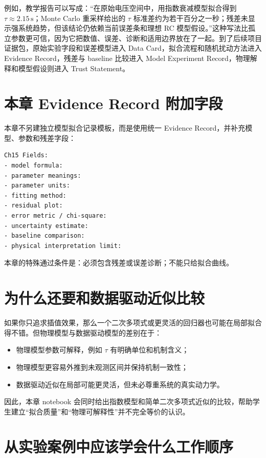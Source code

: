 例如，教学报告可以写成：“在原始电压空间中，用指数衰减模型拟合得到 $\tau \approx 2.15\,\mathrm{s}$；Monte Carlo 重采样给出的 $\tau$ 标准差约为若干百分之一秒；残差未显示强系统趋势，但该结论仍依赖当前误差条和理想 RC 模型假设。”这种写法比孤立参数更可信，因为它把数值、误差、诊断和适用边界放在了一起。到了后续项目证据包，原始实验字段和误差模型进入 Data Card，拟合流程和随机扰动方法进入 Evidence Record，残差与 baseline 比较进入 Model Experiment Record，物理解释和模型假设则进入 Trust Statement。

\section{本章 Evidence Record 附加字段}

本章不另建独立模型拟合记录模板，而是使用统一 Evidence Record，并补充模型、参数和残差字段：

\begin{examplebox}
\begin{lstlisting}[style=terminal]
Ch15 Fields:
- model formula:
- parameter meanings:
- parameter units:
- fitting method:
- residual plot:
- error metric / chi-square:
- uncertainty estimate:
- baseline comparison:
- physical interpretation limit:
\end{lstlisting}
\end{examplebox}

本章的特殊通过条件是：必须包含残差或误差诊断；不能只给拟合曲线。

\section{为什么还要和数据驱动近似比较}

如果你只追求插值效果，那么一个二次多项式或更灵活的回归器也可能在局部拟合得不错。但物理模型与数据驱动模型的差别在于：

\begin{itemize}
    \item 物理模型参数可解释，例如 $\tau$ 有明确单位和机制含义；
    \item 物理模型更容易外推到未观测区间并保持机制一致性；
    \item 数据驱动近似在局部可能更灵活，但未必尊重系统的真实动力学。
\end{itemize}

因此，本章 notebook 会同时给出指数模型和简单二次多项式近似的比较，帮助学生建立“拟合质量”和“物理可解释性”并不完全等价的认识。

\section{从实验案例中应该学会什么工作顺序}

